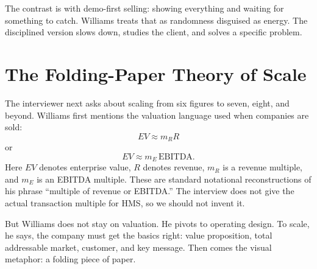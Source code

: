 \begin{figure}
\centering
{}
\end{figure}

The contrast is with demo-first selling: showing everything and waiting for something to catch. Williams treats that as randomness disguised as energy. The disciplined version slows down, studies the client, and solves a specific problem.

\section{The Folding-Paper Theory of Scale}

The interviewer next asks about scaling from six figures to seven, eight, and beyond. Williams first mentions the valuation language used when companies are sold:
\begin{equation}
EV \approx m_R R
\end{equation}
or
\begin{equation}
EV \approx m_E \,\mathrm{EBITDA}.
\end{equation}
Here \(EV\) denotes enterprise value, \(R\) denotes revenue, \(m_R\) is a revenue multiple, and \(m_E\) is an EBITDA multiple. These are standard notational reconstructions of his phrase ``multiple of revenue or EBITDA.'' The interview does not give the actual transaction multiple for HMS, so we should not invent it.

But Williams does not stay on valuation. He pivots to operating design. To scale, he says, the company must get the basics right: value proposition, total addressable market, customer, and key message. Then comes the visual metaphor: a folding piece of paper.

